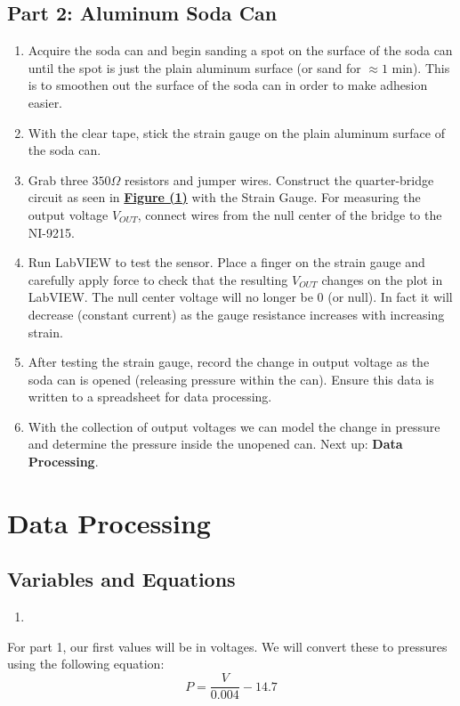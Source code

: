 \documentclass{article}
\begin{document}
\subsection{Part 2: Aluminum Soda Can}
\begin{enumerate}
    \item Acquire the soda can and begin sanding a spot on the surface of the soda can until the spot is just the plain aluminum surface (or sand for $\approx 1$ min). This is to smoothen out the surface of the soda can in order to make adhesion easier.
    \item With the clear tape, stick the strain gauge on the plain aluminum surface of the soda can.
    \item Grab three $350\Omega$ resistors and jumper wires. Construct the quarter-bridge circuit as seen in \hyperlink{Fig1}{\textbf{Figure (1)}} with the Strain Gauge. For measuring the output voltage $V_{OUT}$, connect wires from the null center of the bridge to the NI-9215.
    \item Run LabVIEW to test the sensor. Place a finger on the strain gauge and carefully apply force to check that the resulting $V_{OUT}$ changes on the plot in LabVIEW. The null center voltage will no longer be $0$ (or null). In fact it will decrease (constant current) as the gauge resistance increases with increasing strain.
    \item After testing the strain gauge, record the change in output voltage as the soda can is opened (releasing pressure within the can). Ensure this data is written to a spreadsheet for data processing.
    \item With the collection of output voltages we can model the change in pressure and determine the pressure inside the unopened can. Next up: \textbf{Data Processing}.
\end{enumerate}

\section{Data Processing}
\subsection{Variables and Equations}
\begin{enumerate}[label = \Roman*.]
    \item 
\end{enumerate}

For part 1, our first values will be in voltages. We will convert these to pressures using the following equation:
\[
P = \frac{V}{0.004} - 14.7
\]
\end{document}
